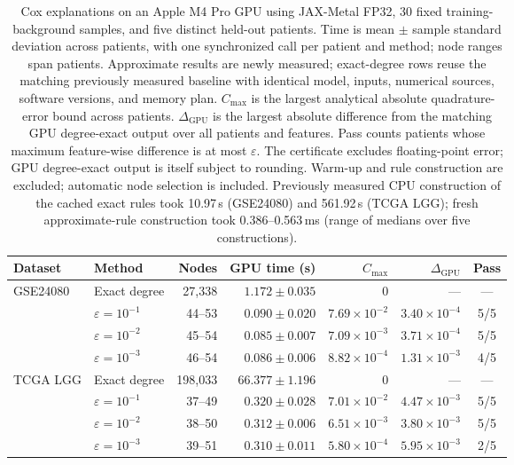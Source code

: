 \begin{table}[t]
\centering
\small
\setlength{\tabcolsep}{4pt}
\begin{tabular}{llrrrrc}
\toprule
Dataset & Method & Nodes & GPU time (s) & $C_{\max}$ & $\Delta_{\mathrm{GPU}}$ & Pass \\
\midrule
GSE24080 & Exact degree & 27,338 & $1.172\pm0.035$ & $0$ & --- & --- \\
 & $\varepsilon=10^{-1}$ & 44--53 & $0.090\pm0.020$ & $7.69\times10^{-2}$ & $3.40\times10^{-4}$ & 5/5 \\
 & $\varepsilon=10^{-2}$ & 45--54 & $0.085\pm0.007$ & $7.09\times10^{-3}$ & $3.71\times10^{-4}$ & 5/5 \\
 & $\varepsilon=10^{-3}$ & 46--54 & $0.086\pm0.006$ & $8.82\times10^{-4}$ & $1.31\times10^{-3}$ & 4/5 \\
\midrule
TCGA LGG & Exact degree & 198,033 & $66.377\pm1.196$ & $0$ & --- & --- \\
 & $\varepsilon=10^{-1}$ & 37--49 & $0.320\pm0.028$ & $7.01\times10^{-2}$ & $4.47\times10^{-3}$ & 5/5 \\
 & $\varepsilon=10^{-2}$ & 38--50 & $0.312\pm0.006$ & $6.51\times10^{-3}$ & $3.80\times10^{-3}$ & 5/5 \\
 & $\varepsilon=10^{-3}$ & 39--51 & $0.310\pm0.011$ & $5.80\times10^{-4}$ & $5.95\times10^{-3}$ & 2/5 \\
\bottomrule
\end{tabular}
\caption{Cox explanations on an Apple M4 Pro GPU using JAX-Metal FP32,
30 fixed training-background samples, and five distinct held-out patients.
Time is mean $\pm$ sample standard deviation across patients, with one
synchronized call per patient and method; node ranges span patients.
Approximate results are newly measured; exact-degree rows reuse the matching
previously measured baseline with identical model, inputs, numerical sources,
software versions, and memory plan.
$C_{\max}$ is the largest analytical absolute quadrature-error bound across
patients. $\Delta_{\mathrm{GPU}}$ is the largest absolute difference from
the matching GPU degree-exact output over all patients and features.
Pass counts patients whose maximum feature-wise difference is at most
$\varepsilon$. The certificate excludes floating-point error; GPU
degree-exact output is itself subject to rounding.
Warm-up and rule construction are excluded; automatic node selection is included.
Previously measured CPU construction of the cached exact rules took 10.97\,s (GSE24080) and 561.92\,s (TCGA LGG); fresh approximate-rule construction took 0.386--0.563\,ms (range of medians over five constructions).}
\label{tab:cox-high-dimensional}
\end{table}

